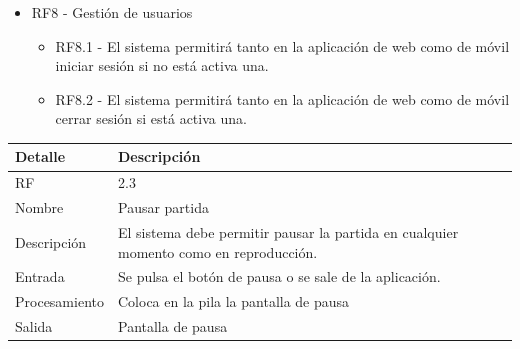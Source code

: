 \documentclass{article}
\begin{document}
\begin{itemize}
\begin{itemize}
      
    \end{itemize}

    \item RF8 - Gestión de usuarios
    \begin{itemize}
      \item RF8.1 - El sistema permitirá tanto en la aplicación de web como de móvil iniciar sesión si no está activa una.
      \item RF8.2 - El sistema permitirá tanto en la aplicación de web como de móvil cerrar sesión si está activa una.
    \end{itemize}

    

\end{itemize}

\begin{table}[H]
  \begin{center}
    \begin{tabularx}{\linewidth}{|X|X|X|} %
      \hline
      \textbf{Detalle} & \textbf{Descripción}\\
      \hline
      RF & 2.3 \\
      \hline
      Nombre & Pausar partida\\
      \hline
      Descripción & El sistema debe permitir pausar la partida en cualquier momento como en reproducción.\\
      \hline
      Entrada & Se pulsa el botón de pausa o se sale de la aplicación.\\
      \hline
      Procesamiento & Coloca en la pila la pantalla de pausa\\
      \hline
      Salida & Pantalla de pausa\\
      \hline
    \end{tabularx}
  \end{center}
\end{table}
\end{document}
